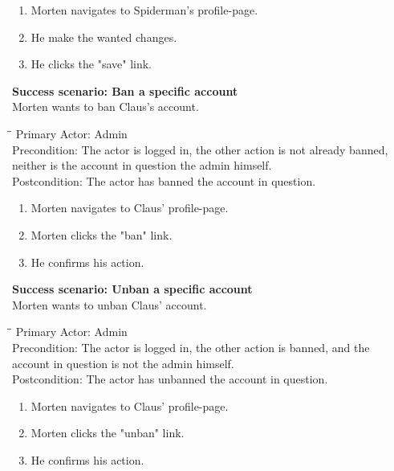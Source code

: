 \begin{enumerate} \setlength{\itemsep}{-1mm}
	\item Morten navigates to Spiderman's profile-page.
	\item He make the wanted changes.
	\item He clicks the "save" link.
\end{enumerate}
\vspace{3mm}
\textbf{Success scenario: Ban a specific account} \\
Morten wants to ban Claus's account.
\begin{tabbing}
\hspace{5mm}\=\hspace{26mm}\=\kill
\>Primary Actor:\> Admin\\
\>Precondition:\> The actor is logged in, the other action is not already banned,\\ \hspace{85px} neither is the account in question the admin himself.\\
\>Postcondition:\> The actor has banned the account in question.
\end{tabbing}
\begin{enumerate} \setlength{\itemsep}{-1mm}
	\item Morten navigates to Claus' profile-page.
	\item Morten clicks the "ban" link.
	\item He confirms his action.
\end{enumerate}
\vspace{3mm}
\textbf{Success scenario: Unban a specific account} \\
Morten wants to unban Claus' account.
\begin{tabbing}
\hspace{5mm}\=\hspace{26mm}\=\kill
\>Primary Actor:\> Admin\\
\>Precondition:\> The actor is logged in, the other action is banned, and the\\ \hspace{85px} account in question is not the admin himself.\\
\>Postcondition:\> The actor has unbanned the account in question.
\end{tabbing}
\begin{enumerate} \setlength{\itemsep}{-1mm}
	\item Morten navigates to Claus' profile-page.
	\item Morten clicks the "unban" link.
	\item He confirms his action.
\end{enumerate}
